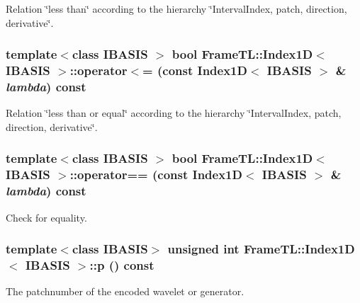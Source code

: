 Relation \char`\"{}less than\char`\"{} according to the hierarchy \char`\"{}IntervalIndex, patch, direction, derivative\char`\"{}. \hypertarget{classFrameTL_1_1Index1D_3509b3f4c7673c40da1485b3b4b77274}{
\subsubsection[{operator$<$=}]{\setlength{\rightskip}{0pt plus 5cm}template$<$class IBASIS $>$ bool {\bf FrameTL::Index1D}$<$ IBASIS $>$::operator$<$= (const {\bf Index1D}$<$ IBASIS $>$ \& {\em lambda}) const}}
\label{classFrameTL_1_1Index1D_3509b3f4c7673c40da1485b3b4b77274}


Relation \char`\"{}less than or equal\char`\"{} according to the hierarchy \char`\"{}IntervalIndex, patch, direction, derivative\char`\"{}. \hypertarget{classFrameTL_1_1Index1D_ae4f859de8325a33501146ddc6794473}{
\subsubsection[{operator==}]{\setlength{\rightskip}{0pt plus 5cm}template$<$class IBASIS $>$ bool {\bf FrameTL::Index1D}$<$ IBASIS $>$::operator== (const {\bf Index1D}$<$ IBASIS $>$ \& {\em lambda}) const}}
\label{classFrameTL_1_1Index1D_ae4f859de8325a33501146ddc6794473}


Check for equality. \hypertarget{classFrameTL_1_1Index1D_81891e5fbcc38d52ac67b79f31fbe4e9}{
\subsubsection[{p}]{\setlength{\rightskip}{0pt plus 5cm}template$<$class IBASIS$>$ unsigned int {\bf FrameTL::Index1D}$<$ IBASIS $>$::p () const}}
\label{classFrameTL_1_1Index1D_81891e5fbcc38d52ac67b79f31fbe4e9}


The patchnumber of the encoded wavelet or generator. 

